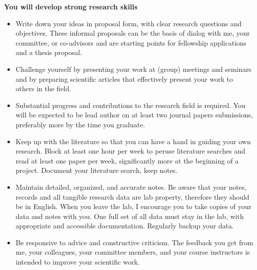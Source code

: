\documentclass{article}
\begin{document}
\textbf{You will develop strong research skills}
\begin{itemize}
\item Write down your ideas in proposal form, with clear research questions and objectives. These informal proposals can be the basis of dialog with me, your committee,  or co-advisors and are starting points for fellowship applications and a thesis proposal.
\item  Challenge yourself by presenting your work at (group) meetings and seminars  and
by preparing scientific articles that effectively present your work to others in the field.
\item Substantial progress and contributions to the research field is required. You will be expected to be lead author on at least two journal papers submissions, preferably more by the time you graduate.  
\item Keep up with the literature so that you can have a hand in guiding your own research. Block
at least one hour per week to peruse literature searches and read at least one paper per week, significantly more at the beginning of a project. Document your literature search, keep notes.
\item  Maintain detailed, organized, and accurate notes. Be aware that your notes,
records and all tangible research data are lab property, therefore they should be in English. When you leave the lab, I
encourage you to take copies of your data and notes with you. One full set of all data must stay in the lab,
with appropriate and accessible documentation. Regularly backup your  data.
\item  Be responsive to advice and constructive criticism. The feedback you get from me, your colleagues,
your committee members, and your course instructors is intended to improve your scientific work.
\end{itemize} 
\end{document}
